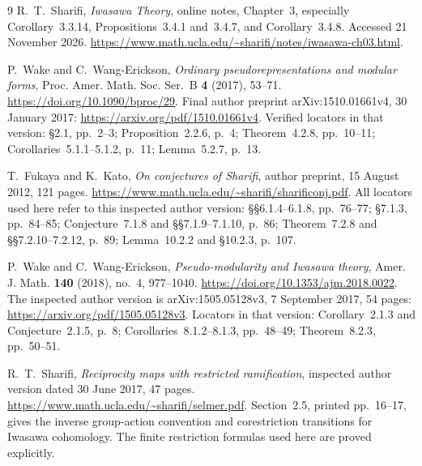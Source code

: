 \documentclass[11pt]{article}
\begin{document}
\makeatletter
{}
\makeatother

\begin{thebibliography}{9}
R.~T.~Sharifi, \emph{Iwasawa Theory}, online notes, Chapter~3,
especially Corollary~3.3.14, Propositions~3.4.1 and~3.4.7,
and Corollary~3.4.8. Accessed 21 November 2026.
\url{https://www.math.ucla.edu/~sharifi/notes/iwasawa-ch03.html}.


P.~Wake and C.~Wang-Erickson,
\emph{Ordinary pseudorepresentations and modular forms},
Proc. Amer. Math. Soc. Ser.~B \textbf{4} (2017), 53--71.
\url{https://doi.org/10.1090/bproc/29}.
Final author preprint arXiv:1510.01661v4, 30 January 2017:
\url{https://arxiv.org/pdf/1510.01661v4}.
Verified locators in that version: \S2.1, pp.~2--3;
Proposition~2.2.6, p.~4; Theorem~4.2.8, pp.~10--11;
Corollaries~5.1.1--5.1.2, p.~11; Lemma~5.2.7, p.~13.


T.~Fukaya and K.~Kato,
\emph{On conjectures of Sharifi}, author preprint,
15 August 2012, 121 pages.
\url{https://www.math.ucla.edu/~sharifi/sharificonj.pdf}.
All locators used here refer to this inspected author version:
\S\S6.1.4--6.1.8, pp.~76--77;
\S7.1.3, pp.~84--85;
Conjecture~7.1.8 and \S\S7.1.9--7.1.10, p.~86;
Theorem~7.2.8 and \S\S7.2.10--7.2.12, p.~89;
Lemma~10.2.2 and \S10.2.3, p.~107.

P.~Wake and C.~Wang-Erickson,
\emph{Pseudo-modularity and Iwasawa theory},
Amer. J. Math. \textbf{140} (2018), no.~4, 977--1040.
\url{https://doi.org/10.1353/ajm.2018.0022}.
The inspected author version is arXiv:1505.05128v3,
7 September 2017, 54 pages:
\url{https://arxiv.org/pdf/1505.05128v3}.
Locators in that version: Corollary~2.1.3 and Conjecture~2.1.5, p.~8;
Corollaries~8.1.2--8.1.3, pp.~48--49;
Theorem~8.2.3, pp.~50--51.


R.~T.~Sharifi,
\emph{Reciprocity maps with restricted ramification},
inspected author version dated 30 June 2017, 47 pages.
\url{https://www.math.ucla.edu/~sharifi/selmer.pdf}.
Section~2.5, printed pp.~16--17, gives the inverse group-action
convention and corestriction transitions for Iwasawa cohomology.
The finite restriction formulas used here are proved explicitly.

\end{thebibliography}
\end{document}
